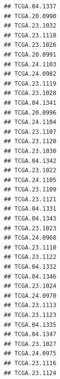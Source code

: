 \documentclass[UTF8]{beamer}\usepackage[]{graphicx}\usepackage[]{color}
\makeatletter
\newenvironment{kframe}{%
 \def\at@end@of@kframe{}%
 \ifinner\ifhmode%
  \def\at@end@of@kframe{\end{minipage}}%
  \begin{minipage}{\columnwidth}%
 \fi\fi%
 \def\FrameCommand##1{\hskip\@totalleftmargin \hskip-\fboxsep
 \colorbox{shadecolor}{##1}\hskip-\fboxsep
     \hskip-\linewidth \hskip-\@totalleftmargin \hskip\columnwidth}%
 \MakeFramed {\advance\hsize-\width
   \@totalleftmargin\z@ \linewidth\hsize
   \@setminipage}}%
 {\par\unskip\endMakeFramed%
 \at@end@of@kframe}
\newenvironment{knitrout}{}{} %
\makeatother
\begin{document}
\begin{frame}[fragile]
\begin{knitrout}
\begin{kframe}
\begin{verbatim}
## TCGA.04.1337                                                    
## TCGA.20.0990                                                    
## TCGA.23.1032                                                    
## TCGA.23.1118                                                    
## TCGA.23.1026                                                    
## TCGA.20.0991                                                    
## TCGA.24.1103                                                    
## TCGA.24.0982                                                    
## TCGA.23.1119                                                    
## TCGA.23.1028                                                    
## TCGA.04.1341                                                    
## TCGA.20.0996                                                    
## TCGA.24.1104                                                    
## TCGA.23.1107                                                    
## TCGA.23.1120                                                    
## TCGA.23.1030                                                    
## TCGA.04.1342                                                    
## TCGA.23.1022                                                    
## TCGA.24.1105                                                    
## TCGA.23.1109                                                    
## TCGA.23.1121                                                    
## TCGA.04.1331                                                    
## TCGA.04.1343                                                    
## TCGA.23.1023                                                    
## TCGA.24.0968                                                    
## TCGA.23.1110                                                    
## TCGA.23.1122                                                    
## TCGA.04.1332                                                    
## TCGA.04.1346                                                    
## TCGA.23.1024                                                    
## TCGA.24.0970                                                    
## TCGA.23.1113                                                    
## TCGA.23.1123                                                    
## TCGA.04.1335                                                    
## TCGA.04.1347                                                    
## TCGA.23.1027                                                    
## TCGA.24.0975                                                    
## TCGA.23.1116                                                    
## TCGA.23.1124                                                    

\end{verbatim}
\end{kframe}
\end{knitrout}
\end{frame}
\end{document}
